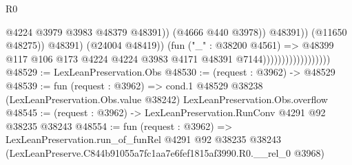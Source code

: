 \begin{lexlean}{R0}
\begin{coremodule}
                                                      @4224
                                                      @3979
                                                      @3983
                                                      @48379
                                                      @48391))
                                                  (@4666 @440 @3978))
                                                @48391))
                                            (@11650 @48275))
                                          @48391)
                                        (@24004 @48419))
                                      (fun ("_" : @38200 @4561) =>
                                      @48399
                                        @117
                                        @106
                                        @173
                                        @4224
                                        @4224
                                        @3983
                                        @4171
                                        @48391
                                        @7144))))))))))))))))))
@48529 := LexLeanPreservation.Obs
@48530 := (request : @3962) -> @48529
@48539 := fun (request : @3962) =>
  cond.{1} @48529 @38238 (LexLeanPreservation.Obs.value @38242) LexLeanPreservation.Obs.overflow
@48545 := (request : @3962) -> LexLeanPreservation.RunConv @4291 @92 @38235 @38243
@48554 := fun (request : @3962) =>
  LexLeanPreservation.run_of_funRel
    @4291
    @92
    @38235
    @38243
    (LexLeanPreserve.C844b91055a7fc1aa7e6fef1815af3990.R0.__rel_0 @3968)
\end{coremodule}
\end{lexlean}
